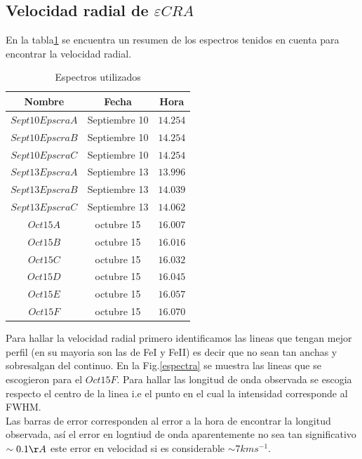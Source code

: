 \documentclass[Proceedings]{ascelike}
\begin{document}
\subsection{Velocidad radial de $\varepsilon CRA$}

En la tabla\ref{spectra} se encuentra un resumen de los espectros tenidos en cuenta para encontrar la velocidad radial.\\

\begin{table}
\begin{center}
\begin{tabular}{|c| c |c|}
\hline
Nombre & Fecha & Hora\\
\hline
$Sept10EpscraA$ & Septiembre 10 & $14.254$\\
\hline
$Sept10EpscraB$ & Septiembre 10 & $14.254$\\
\hline
$Sept10EpscraC$ & Septiembre 10 & $14.254$\\
\hline
$Sept13EpscraA$ & Septiembre 13 & $13.996$\\
\hline
$Sept13EpscraB$ & Septiembre 13 & $14.039$\\
\hline
$Sept13EpscraC$ & Septiembre 13 & $14.062$\\
\hline
$Oct15A$ & octubre 15 & $16.007$\\
\hline
$Oct15B$ & octubre 15 & $16.016$\\
\hline
$Oct15C$ & octubre 15 & $16.032$\\
\hline
$Oct15D$ & octubre 15 & $16.045$\\
\hline
$Oct15E$& octubre 15 & $16.057$\\
\hline
$Oct15F$ & octubre 15 & $16.070$\\
\hline
\end{tabular}
\caption{Espectros utilizados\label{spectra}}
\end{center}
\end{table}


Para hallar la velocidad radial primero identificamos las lineas que tengan mejor perfil (en su mayoria son las de FeI y FeII) es decir que no sean tan anchas y sobresalgan del continuo.
En la Fig.\ref{espectra} se muestra las lineas que se escogieron para el $Oct15F$. Para hallar las longitud de onda observada
se escogia respecto el centro de la linea i.e el punto en el cual la intensidad corresponde al FWHM. \\

Las barras de error corresponden al error a la hora de encontrar la longitud observada, as\'i el error en logntiud de onda aparentemente no sea tan significativo $\sim 0.1 \AA$ este error 
en velocidad si es considerable $\sim 7 kms^{-1}$. \\ 
\end{document}
